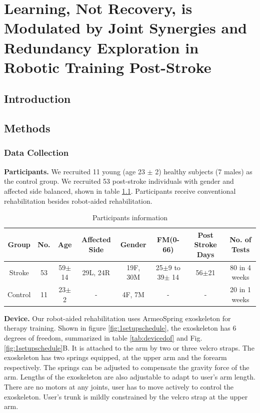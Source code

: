 \chapter{Learning, Not Recovery, is Modulated by Joint Synergies and Redundancy Exploration in Robotic Training Post-Stroke}
\label{cha:armeospring}



\section{Introduction}



\section{Methods}

\subsection{Data Collection}

\textbf{Participants.} 
We recruited 11 young (age 23 $\pm$ 2) healthy subjects (7 males) as the control group.
We recruited 53 post-stroke individuals with gender and affected side balanced, shown in table \ref{tab:demog}. 
Participants receive conventional rehabilitation besides robot-aided rehabilitation.

\begin{table}[b]
	\begin{tabular}{c c c c c c c c}
		\hline
		Group & No. & Age & Affected Side & Gender & FM(0-66) & Post Stroke Days & No. of Tests\\
		\hline
		Stroke & 53 & 59$\pm$14 & 29L, 24R & 19F, 30M & 25$\pm$9 to 39$\pm$ 14 & 56$\pm$21 & 80 in 4 weeks \\ 
		Control & 11 & 23$\pm$2 & - & 4F, 7M & - & - & 20 in 1 weeks \\
		\hline
	\end{tabular}
	\caption{Participants information}
	\label{tab:demog}
\end{table}

\textbf{Device.}
Our robot-aided rehabilitation uses ArmeoSpring exoskeleton \cite{} for therapy training. 
Shown in figure \ref{fig:1setupschedule}, the exoskeleton has 6 degrees of freedom, summarized in table \ref{tab:devicedof} and Fig. \ref{fig:1setupschedule}B. 
It is attached to the arm by two or three velcro straps. 
The exoskeleton has two springs equipped, at the upper arm and the forearm respectively. 
The springs can be adjusted to compensate the gravity force of the arm. 
Lengths of the exoskeleton are also adjustable to adapt to user's arm length.
There are no motors at any joints, user has to move actively to control the exoskeleton. 
User's trunk is mildly constrained by the velcro strap at the upper arm.



